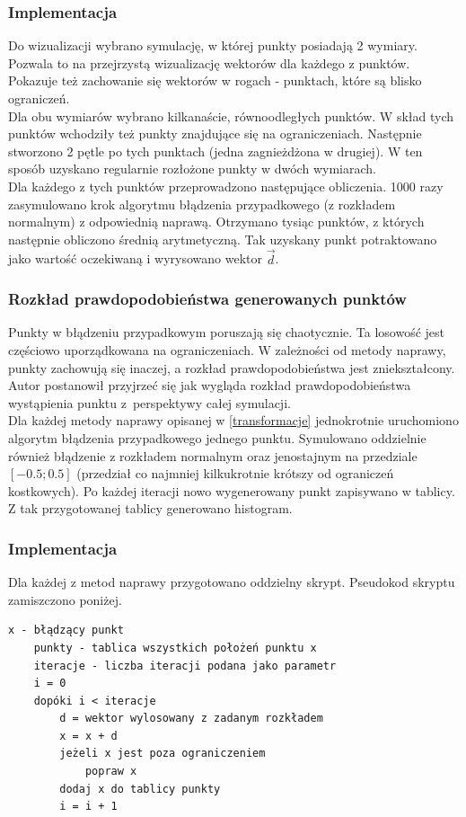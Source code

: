 \documentclass{mini}
\begin{document}
\subsubsection*{Implementacja}
Do wizualizacji wybrano symulację, w której punkty posiadają 2 wymiary. Pozwala to na przejrzystą wizualizację wektorów dla każdego z punktów. Pokazuje też zachowanie się wektorów w rogach - punktach, które są blisko ograniczeń.\\
Dla obu wymiarów wybrano kilkanaście, równoodległych punktów. W skład tych punktów wchodziły też punkty znajdujące się na ograniczeniach. Następnie stworzono 2 pętle po tych punktach (jedna zagnieżdżona w drugiej). W ten sposób uzyskano regularnie rozłożone punkty w dwóch wymiarach.\\
Dla każdego z tych punktów przeprowadzono następujące obliczenia. 1000 razy zasymulowano krok algorytmu błądzenia przypadkowego (z rozkładem normalnym) z odpowiednią naprawą. Otrzymano tysiąc punktów, z których następnie obliczono średnią arytmetyczną. Tak uzyskany punkt potraktowano jako wartość oczekiwaną i wyrysowano wektor $\overrightarrow{d}$.

\subsubsection{Rozkład prawdopodobieństwa generowanych punktów}
Punkty w błądzeniu przypadkowym poruszają się chaotycznie. Ta losowość jest częściowo uporządkowana na ograniczeniach. W zależności od metody naprawy, punkty zachowują się inaczej, a rozkład prawdopodobieństwa jest zniekształcony. Autor postanowił przyjrzeć się jak wygląda rozkład prawdopodobieństwa wystąpienia punktu z~perspektywy całej symulacji.\\
Dla każdej metody naprawy opisanej w \ref{transformacje} jednokrotnie uruchomiono algorytm błądzenia przypadkowego jednego punktu. Symulowano oddzielnie również błądzenie z rozkładem normalnym oraz jenostajnym na przedziale $[-0.5; 0.5]$ (przedział co najmniej kilkukrotnie krótszy od ograniczeń kostkowych). Po każdej iteracji nowo wygenerowany punkt zapisywano w tablicy. Z tak przygotowanej tablicy generowano histogram.

\subsubsection*{Implementacja}
Dla każdej z metod naprawy  przygotowano oddzielny skrypt. Pseudokod skryptu zamiszczono poniżej.
\begin{Verbatim}[baselinestretch=1.1]
	x - błądzący punkt
	punkty - tablica wszystkich położeń punktu x
	iteracje - liczba iteracji podana jako parametr
	i = 0
	dopóki i < iteracje
		d = wektor wylosowany z zadanym rozkładem
		x = x + d
		jeżeli x jest poza ograniczeniem
			popraw x
		dodaj x do tablicy punkty
		i = i + 1
\end{Verbatim}
\end{document}
